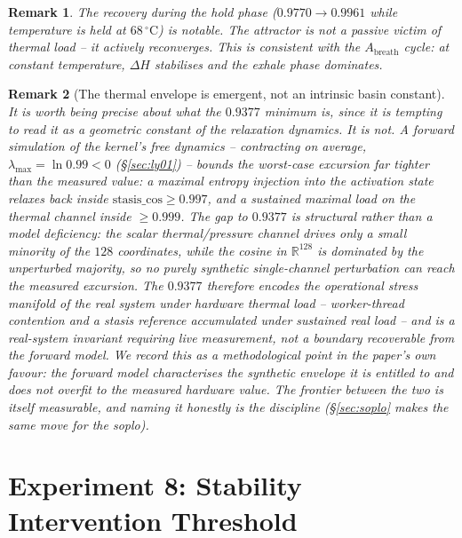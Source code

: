\documentclass[11pt, a4paper]{article}
\newtheorem{remark}{Remark}
\begin{document}
\begin{remark}
The recovery during the hold phase ($0.9770 \to 0.9961$ while temperature
is held at $68\,^\circ\mathrm{C}$) is notable.
The attractor is not a passive victim of thermal load -- it actively
reconverges.
This is consistent with the $A_\text{breath}$ cycle: at constant temperature,
$\Delta H$ stabilises and the exhale phase dominates.
\end{remark}

\begin{remark}[The thermal envelope is emergent, not an intrinsic basin constant]
\label{rem:emergent_envelope}
It is worth being precise about what the $0.9377$ minimum \emph{is}, since it is
tempting to read it as a geometric constant of the relaxation dynamics. It is
not. A forward simulation of the kernel's free dynamics -- contracting on average,
$\lambda_{\max}=\ln 0.99 < 0$ (\S\ref{sec:ly01}) -- bounds the worst-case
excursion far tighter than the measured value: a maximal entropy injection into
the activation state relaxes back inside $\text{stasis\_cos} \ge 0.997$, and a
sustained maximal load on the thermal channel inside $\ge 0.999$. The gap to
$0.9377$ is structural rather than a model deficiency: the scalar thermal/pressure
channel drives only a small minority of the $128$ coordinates, while the cosine in
$\mathbb{R}^{128}$ is dominated by the unperturbed majority, so no purely synthetic
single-channel perturbation can reach the measured excursion. The $0.9377$
therefore encodes the operational stress manifold of the \emph{real} system under
hardware thermal load -- worker-thread contention and a stasis reference
accumulated under sustained real load -- and is a real-system invariant requiring
live measurement, not a boundary recoverable from the forward model. We record
this as a methodological point in the paper's own favour: the forward model
characterises the synthetic envelope it is entitled to and does \emph{not} overfit
to the measured hardware value. The frontier between the two is itself measurable,
and naming it honestly is the discipline (\S\ref{sec:soplo} makes the same move
for the soplo).
\end{remark}


\section{Experiment 8: Stability Intervention Threshold}
\label{sec:psi}
\end{document}

